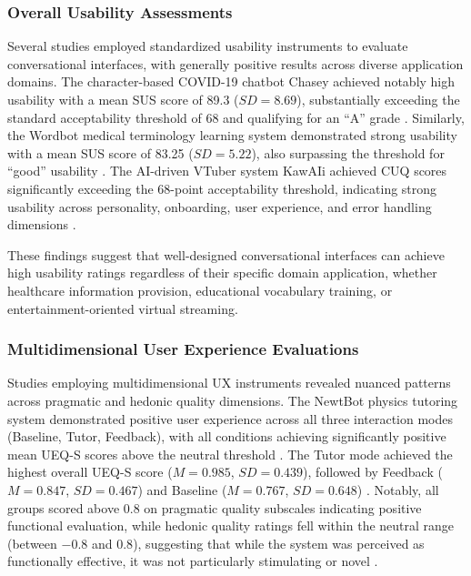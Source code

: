\documentclass[manuscript,anonymous,sigconf]{acmart}
\begin{document}
\subsubsection{Overall Usability Assessments}

Several studies employed standardized usability instruments to evaluate conversational interfaces, with generally positive results across diverse application domains. The character-based COVID-19 chatbot Chasey achieved notably high usability with a mean SUS score of 89.3 ($SD = 8.69$), substantially exceeding the standard acceptability threshold of 68 and qualifying for an ``A'' grade \cite{A79}. Similarly, the Wordbot medical terminology learning system demonstrated strong usability with a mean SUS score of 83.25 ($SD = 5.22$), also surpassing the threshold for ``good'' usability \cite{A34}. The AI-driven VTuber system KawAIi achieved CUQ scores significantly exceeding the 68-point acceptability threshold, indicating strong usability across personality, onboarding, user experience, and error handling dimensions \cite{A81}.

These findings suggest that well-designed conversational interfaces can achieve high usability ratings regardless of their specific domain application, whether healthcare information provision, educational vocabulary training, or entertainment-oriented virtual streaming.

\subsubsection{Multidimensional User Experience Evaluations}

Studies employing multidimensional UX instruments revealed nuanced patterns across pragmatic and hedonic quality dimensions. The NewtBot physics tutoring system demonstrated positive user experience across all three interaction modes (Baseline, Tutor, Feedback), with all conditions achieving significantly positive mean UEQ-S scores above the neutral threshold \cite{A22}. The Tutor mode achieved the highest overall UEQ-S score ($M = 0.985$, $SD = 0.439$), followed by Feedback ($M = 0.847$, $SD = 0.467$) and Baseline ($M = 0.767$, $SD = 0.648$) \cite{A22}. Notably, all groups scored above 0.8 on pragmatic quality subscales indicating positive functional evaluation, while hedonic quality ratings fell within the neutral range (between $-0.8$ and $0.8$), suggesting that while the system was perceived as functionally effective, it was not particularly stimulating or novel \cite{A22}.
\end{document}
